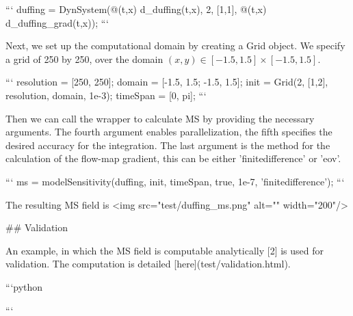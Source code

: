 ```
duffing = DynSystem(@(t,x) d_duffing(t,x), 2, [1,1], @(t,x) d_duffing_grad(t,x));
```

Next, we set up the computational domain by creating a Grid object. We specify a grid of 250 by 250, over the domain $(x,y)\in[-1.5,1.5]\times [-1.5,1.5] $.

```
resolution = [250, 250]; 
domain = [-1.5, 1.5; -1.5, 1.5];
init = Grid(2, [1,2], resolution, domain, 1e-3);
timeSpan = [0, pi];
```

Then we can call the wrapper to calculate MS by providing the necessary arguments. The fourth argument enables parallelization, the fifth specifies the desired accuracy for the integration. The last argument is the method for the calculation of the flow-map gradient, this can be either 'finitedifference' or 'eov'. 

```
ms = modelSensitivity(duffing, init, timeSpan, true, 1e-7, 'finitedifference');
```

The resulting MS field is 
<img src="test/duffing_ms.png" alt="" width="200"/>


## Validation 

An example, in which the MS field is computable analytically [2] is used for validation. The computation is detailed [here](test/validation.html).




```python

```
